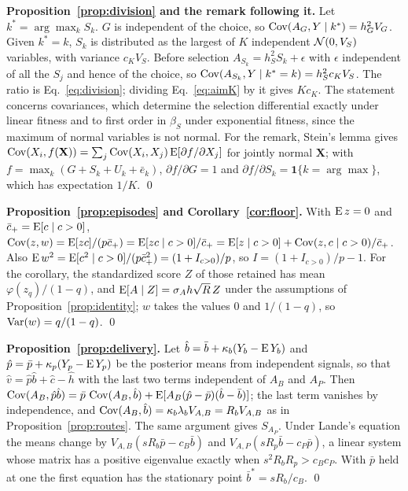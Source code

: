\textbf{Proposition~\ref{prop:division} and the remark following it.} Let $k^*=\arg\max_kS_k$. $G$ is independent of the
choice, so $\operatorname{Cov}(A_G,Y\mid k^*)=h_G^2V_G$. Given $k^*=k$, $S_k$ is distributed as the largest of $K$ independent $\mathcal{N}(0,V_S)$
variables, with variance $c_KV_S$. Before selection $A_{S_k}=h_S^2S_k+\epsilon$ with $\epsilon$ independent of all the $S_j$
and hence of the choice, so $\operatorname{Cov}(A_{S_k},Y\mid k^*=k)=h_S^2c_KV_S$. The ratio is Eq.~\eqref{eq:division}; dividing
Eq.~\eqref{eq:aimK} by it gives $Kc_K$. The statement concerns covariances, which determine the selection differential
exactly under linear fitness and to first order in $\beta_S$ under exponential fitness, since the maximum of normal
variables is not normal. For the remark, Stein's lemma gives $\operatorname{Cov}(X_i,f(\mathbf X))=\sum_j\operatorname{Cov}(X_i,X_j)\operatorname{E}[\partial
f/\partial X_j]$ for jointly normal $\mathbf X$; with $f=\max_k(G+S_k+U_k+\bar e_k)$, $\partial f/\partial G=1$ and
$\partial f/\partial S_k=\mathbf 1\{k=\arg\max\}$, which has expectation $1/K$. \qed

\textbf{Proposition~\ref{prop:episodes} and Corollary~\ref{cor:floor}.} With $\operatorname{E} z=0$ and $\bar c_+=\operatorname{E}[c\mid c>0]$,
$\operatorname{Cov}(z,w)=\operatorname{E}[zc]/(p\bar c_+)=\operatorname{E}[zc\mid c>0]/\bar c_+=\operatorname{E}[z\mid c>0]+\operatorname{Cov}(z,c\mid c>0)/\bar c_+$. Also
$\operatorname{E} w^2=\operatorname{E}[c^2\mid c>0]/(p\bar c_+^2)=(1+I_{c>0})/p$, so $I=(1+I_{c>0})/p-1$. For the corollary, the standardized score $Z$ of
those retained has mean $\varphi(z_q)/(1-q)$, and $\operatorname{E}[A\mid Z]=\sigma_Ah\sqrt R\,Z$ under the assumptions of
Proposition~\ref{prop:identity}; $w$ takes the values 0 and $1/(1-q)$, so $\operatorname{Var}(w)=q/(1-q)$. \qed

\textbf{Proposition~\ref{prop:delivery}.} Let $\hat b=\bar b+\kappa_b(Y_b-\operatorname{E} Y_b)$ and $\hat p=\bar p+\kappa_p(Y_p-\operatorname{E} Y_p)$ be the
posterior means from independent signals, so that $\hat v=\hat p\hat b+\hat c-\hat h$ with the last two terms independent of
$A_B$ and $A_P$. Then $\operatorname{Cov}(A_B,\hat p\hat b)=\bar p\,\operatorname{Cov}(A_B,\hat b)+\operatorname{E}[A_B(\hat p-\bar p)(\hat b-\bar b)]$; the last term
vanishes by independence, and $\operatorname{Cov}(A_B,\hat b)=\kappa_b\lambda_bV_{A,B}=R_bV_{A,B}$ as in Proposition~\ref{prop:routes}. The
same argument gives $S_{A_P}$. Under Lande's equation the means change by $V_{A,B}(sR_b\bar p-c_B\bar b)$ and
$V_{A,P}(sR_p\bar b-c_P\bar p)$, a linear system whose matrix has a positive eigenvalue exactly when
$s^2R_bR_p>c_Bc_P$. With $\bar p$ held at one the first equation has the stationary point $\bar b^*=sR_b/c_B$. \qed

